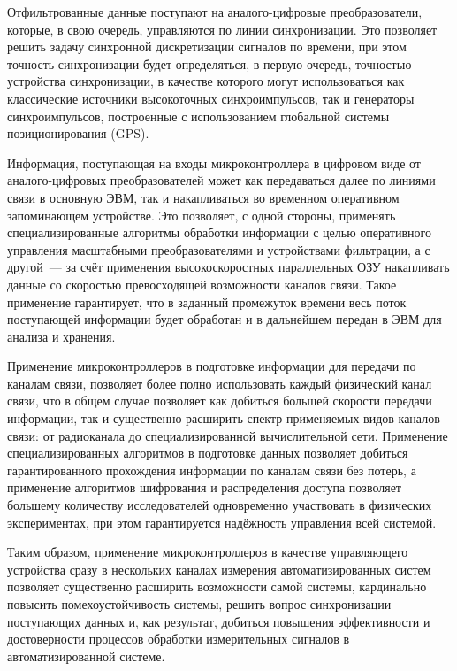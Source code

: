 \documentclass[a4paper, 14pt, titlepage]{extarticle}
\begin{document}
  Отфильтрованные данные поступают на аналого-цифровые преобразователи, которые, в свою очередь,
  управляются по линии синхронизации. Это позволяет решить задачу синхронной дискретизации сигналов
  по времени, при этом точность синхронизации будет определяться, в первую очередь, точностью
  устройства синхронизации, в качестве которого могут использоваться как классические источники
  высокоточных синхроимпульсов, так и генераторы синхроимпульсов, построенные с использованием
  глобальной системы позиционирования (GPS).

  Информация, поступающая на входы микроконтроллера в цифровом виде от аналого-цифровых
  преобразователей может как передаваться далее по линиями связи в основную ЭВМ, так и
  накапливаться во временном оперативном запоминающем устройстве. Это позволяет, с одной стороны,
  применять специализированные алгоритмы обработки информации с целью оперативного управления
  масштабными преобразователями и устройствами фильтрации, а с другой~--- за счёт применения
  высокоскоростных параллельных ОЗУ накапливать данные со скоростью превосходящей возможности
  каналов связи. Такое применение гарантирует, что в заданный промежуток времени весь поток
  поступающей информации будет обработан и в дальнейшем передан в ЭВМ для анализа и хранения.

  Применение микроконтроллеров в подготовке информации для передачи по каналам связи, позволяет
  более полно использовать каждый физический канал связи, что в общем случае позволяет как добиться
  большей скорости передачи информации, так и существенно расширить спектр применяемых видов каналов
  связи: от радиоканала до специализированной вычислительной сети. Применение специализированных
  алгоритмов в подготовке данных позволяет добиться гарантированного прохождения информации по
  каналам связи без потерь, а применение алгоритмов шифрования и распределения доступа позволяет
  большему количеству исследователей одновременно участвовать в физических экспериментах, при этом
  гарантируется надёжность управления всей системой.

  Таким образом, применение микроконтроллеров в качестве управляющего устройства сразу в нескольких
  каналах измерения автоматизированных систем позволяет существенно расширить возможности самой
  системы, кардинально повысить помехоустойчивость системы, решить вопрос синхронизации поступающих
  данных и, как результат, добиться повышения эффективности и достоверности процессов обработки
  измерительных сигналов в автоматизированной системе.
\end{document}
